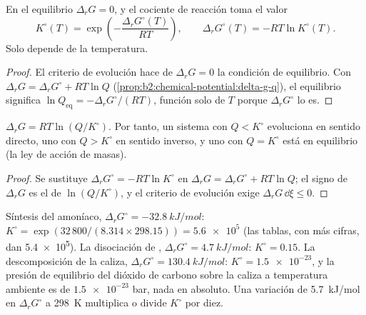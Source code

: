\begin{theorem}\label{thm:b2:equilibrium-shifts:k-from-g}
En el equilibrio $\Delta_r G = 0$, y el cociente de reacción toma el valor
\[
  K^\circ(T) = \exp\!\left(-\frac{\Delta_r G^\circ(T)}{RT}\right), \qquad
  \Delta_r G^\circ(T) = -RT\ln K^\circ(T) .
\]
Solo depende de la temperatura.
\end{theorem}

\begin{proof}
El criterio de evolución hace de $\Delta_r G = 0$ la condición de equilibrio.
Con $\Delta_r G = \Delta_r G^\circ + RT\ln Q$
(\cref{prop:b2:chemical-potential:delta-g-q}), el equilibrio significa $\ln Q_{\text{eq}}
= -\Delta_r G^\circ/(RT)$, función solo de $T$ porque $\Delta_r G^\circ$ lo es.
\end{proof}

\begin{corollary}\label{cor:b2:equilibrium-shifts:mass-action}
$\Delta_r G = RT\ln(Q/K^\circ)$. Por tanto, un sistema con $Q < K^\circ$ evoluciona
en sentido directo, uno con $Q > K^\circ$ en sentido inverso, y uno con $Q = K^\circ$ está en
equilibrio (la ley de acción de masas).
\end{corollary}

\begin{proof}
Se sustituye $\Delta_r G^\circ = -RT\ln K^\circ$ en $\Delta_r G = \Delta_r G^\circ
+ RT\ln Q$; el signo de $\Delta_r G$ es el de $\ln(Q/K^\circ)$, y el
criterio de evolución exige $\Delta_r G\,\dd\xi \leq 0$.
\end{proof}

\begin{example}\label{ex:b2:equilibrium-shifts:constants}
Síntesis del amoníaco, $\Delta_r G^\circ = \qty{-32.8}{kJ/mol}$: $K^\circ =
\exp(32\,800/(8.314 \times 298.15)) = \num{5.6e5}$ (las tablas, con más
cifras, dan \num{5.4e5}). La disociación de , $\Delta_r G^\circ =
\qty{+4.7}{kJ/mol}$: $K^\circ = 0.15$. La descomposición de la caliza,
$\Delta_r G^\circ = \qty{+130.4}{kJ/mol}$: $K^\circ = \num{1.5e-23}$, y la
presión de equilibrio del dióxido de carbono sobre la caliza a temperatura ambiente
es de $\num{1.5e-23}$ bar, nada en absoluto. Una variación de \qty{5.7}{kJ/mol} en
$\Delta_r G^\circ$ a \qty{298}{K} multiplica o divide $K^\circ$ por diez.
\end{example}

